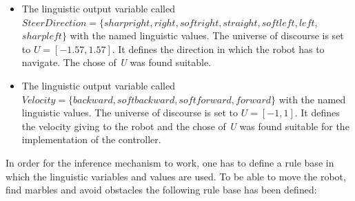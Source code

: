 \documentclass[../Head/Main.tex]{subfiles}
\begin{document}
\begin{itemize}
\item The linguistic output variable called $SteerDirection = \{sharpright, right, softright, straight, softleft, left$, $sharpleft\}$ with the named linguistic values. The universe of discourse is set to ${U} = [-1.57, 1.57]$. It defines the direction in which the robot has to navigate. The chose of \textit{U} was found suitable.
\item The linguistic output variable called $Velocity = \{backward, softbackward, softforward, forward\}$ with the named linguistic values. The universe of discourse is set to ${U} = [-1, 1]$. It defines the velocity giving to the robot and the chose of \textit{U} was found suitable for the implementation of the controller.      
\end{itemize}
In order for the inference mechanism to work, one has to define a rule base in which the linguistic variables and values are used. To be able to move the robot, find marbles and avoid obstacles the following rule base has been defined:  
\end{document}
